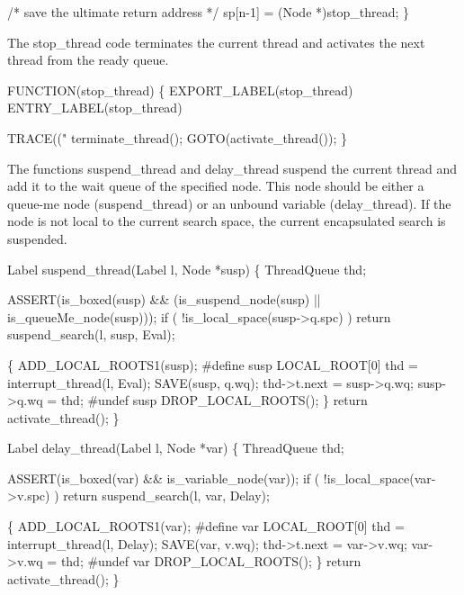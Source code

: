     /* save the ultimate return address */
    sp[n-1] = (Node *)stop_thread;
\}

\nwendcode{}\nwdocspar
The {\Tt{}stop{\_}thread\nwendquote} code terminates the current thread and
activates the next thread from the ready queue.

\nwenddocs{}\plusendmoddef\nwstartdeflinemarkup{}\nwenddeflinemarkup
FUNCTION(stop_thread)
\{
    EXPORT_LABEL(stop_thread)
 ENTRY_LABEL(stop_thread)

    TRACE(("%
    terminate_thread();
    GOTO(activate_thread());
\}

\nwendcode{}\nwdocspar
The functions {\Tt{}suspend{\_}thread\nwendquote} and {\Tt{}delay{\_}thread\nwendquote} suspend the
current thread and add it to the wait queue of the specified node.
This node should be either a queue-me node ({\Tt{}suspend{\_}thread\nwendquote}) or an
unbound variable ({\Tt{}delay{\_}thread\nwendquote}). If the node is not local to the
current search space, the current encapsulated search is suspended.

\nwenddocs{}\plusendmoddef\nwstartdeflinemarkup{}\nwenddeflinemarkup
Label
suspend_thread(Label l, Node *susp)
\{
    ThreadQueue thd;

    ASSERT(is_boxed(susp) && (is_suspend_node(susp) || is_queueMe_node(susp)));
    if ( !is_local_space(susp->q.spc) )
        return suspend_search(l, susp, Eval);

    \{
        ADD_LOCAL_ROOTS1(susp);
#define susp LOCAL_ROOT[0]
        thd = interrupt_thread(l, Eval);
        SAVE(susp, q.wq);
        thd->t.next = susp->q.wq;
        susp->q.wq  = thd;
#undef susp
        DROP_LOCAL_ROOTS();
    \}
    return activate_thread();
\}

Label
delay_thread(Label l, Node *var)
\{
    ThreadQueue thd;

    ASSERT(is_boxed(var) && is_variable_node(var));
    if ( !is_local_space(var->v.spc) )
        return suspend_search(l, var, Delay);

    \{
        ADD_LOCAL_ROOTS1(var);
#define var LOCAL_ROOT[0]
        thd = interrupt_thread(l, Delay);
        SAVE(var, v.wq);
        thd->t.next = var->v.wq;
        var->v.wq   = thd;
#undef var
        DROP_LOCAL_ROOTS();
    \}
    return activate_thread();
\}

